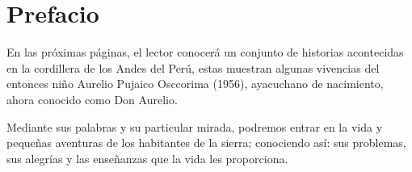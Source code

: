 \cleardoublepage
\newpage
\thispagestyle{empty}
\vfill


\chapter*{Prefacio} %

En las próximas páginas, el lector conocerá un conjunto de historias acontecidas en la cordillera de los Andes del Perú, estas muestran algunas vivencias del entonces niño Aurelio Pujaico Osccorima (1956), %
ayacuchano de nacimiento,
ahora conocido como Don Aurelio.

Mediante sus palabras y su particular mirada, podremos entrar en la vida y pequeñas aventuras de los habitantes de la sierra; conociendo así: sus problemas, sus alegrías y las enseñanzas que la vida les proporciona.
\vfill

\newpage
\thispagestyle{empty}
